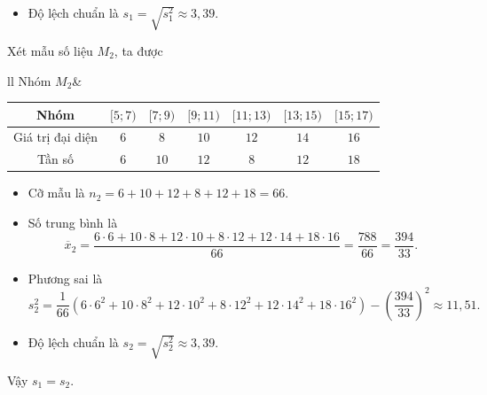\begin{ex}
{\begin{itemize}
			\[s_1^2 = \dfrac{1}{33}\left(3 \cdot 6^2 + 5 \cdot 8^2 + 6 \cdot 10^2 + 4 \cdot 12^2 + 6 \cdot 14^2 + 9 \cdot 16^2\right)- \left(\dfrac{394}{33}\right)^2 \approx 11{,}51.\]
			\item Độ lệch chuẩn là $s_1=\sqrt{s_1^2}\approx 3{,}39$.
		\end{itemize}
		Xét mẫu số liệu $M_2$, ta được
		\begin{center}
			\begin{tabular}{ll}
				Nhóm $M_2$&
				\begin{tabular}{|c|c|c|c|c|c|c|}
					\hline
					Nhóm & $[5;7)$ & $[7;9)$ & $[9;11)$ & $[11;13)$ & $[13;15)$ & $[15;17)$ \\
					\hline
					Giá trị đại diện & $6$ & $8$ & $10$ & $12$ & $14$ & $16$ \\
					\hline
					Tần số & $6$ & $10$ & $12$ & $8$ & $12$ & $18$ \\
					\hline
				\end{tabular}
			\end{tabular}
		\end{center}
		\begin{itemize}
			\item Cỡ mẫu là $n_2=6+10+12+8+12+18=66$.
			\item Số trung bình là
			\[\overline{x}_2 = \dfrac{6 \cdot 6 + 10 \cdot 8 + 12 \cdot 10 + 8 \cdot 12 + 12 \cdot 14 + 18 \cdot 16}{66} = \dfrac{788}{66} = \dfrac{394}{33} .\]
			\item Phương sai là
			\[s_2^2 = \dfrac{1}{66} \left(6 \cdot 6^2 + 10 \cdot 8^2 + 12 \cdot 10^2 + 8 \cdot 12^2 + 12 \cdot 14^2 + 18 \cdot 16^2\right)- \left(\dfrac{394}{33}\right)^2 \approx 11{,}51.\]
			\item Độ lệch chuẩn là $s_2=\sqrt{s_2^2}\approx 3{,}39$.
		\end{itemize}
		Vậy $s_1=s_2$.
	}
\end{ex}

